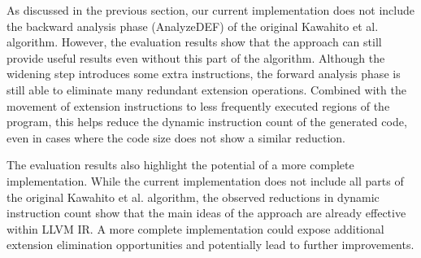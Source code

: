 As discussed in the previous section, our current implementation does not include the backward analysis phase (AnalyzeDEF) of the original Kawahito et al. algorithm. However, the evaluation results show that the approach can still provide useful results even without this part of the algorithm. Although the widening step introduces some extra instructions, the forward analysis phase is still able to eliminate many redundant extension operations. Combined with the movement of extension instructions to less frequently executed regions of the program, this helps reduce the dynamic instruction count of the generated code, even in cases where the code size does not show a similar reduction.

The evaluation results also highlight the potential of a more complete implementation. While the current implementation does not include all parts of the original Kawahito et al. algorithm, the observed reductions in dynamic instruction count show that the main ideas of the approach are already effective within LLVM IR. A more complete implementation could expose additional extension elimination opportunities and potentially lead to further improvements.